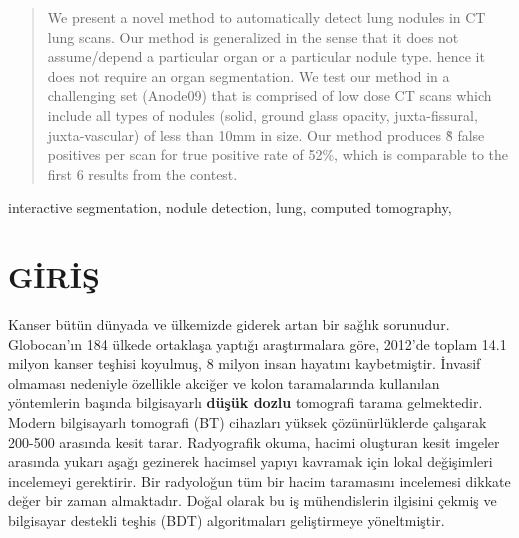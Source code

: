 \documentclass[conference]{IEEEtran}
\begin{document}
\begin{abstract}
We present a novel method to automatically detect lung nodules in CT lung scans. Our method is generalized in the sense that it does not assume/depend a particular organ or a particular nodule type. hence it does not require an organ segmentation. We test our method in a challenging set (Anode09) that is comprised of low dose CT scans which include all types of nodules (solid, ground glass opacity, juxta-fissural, juxta-vascular) of less than 10mm in size. Our method produces \~8 false positives per scan for true positive rate of 52\%, which is comparable to the first 6 results from the contest.
\end{abstract}
\begin{IEEEkeywords}
interactive segmentation, nodule detection, lung, computed tomography,
\end{IEEEkeywords}



%
\IEEEpeerreviewmaketitle

\IEEEpubidadjcol

\section{GİRİŞ}

Kanser bütün dünyada ve ülkemizde giderek artan bir sağlık sorunudur. Globocan’ın \cite{ferlay2012} 184 ülkede ortaklaşa yaptığı araştırmalara göre, 2012’de toplam 14.1 milyon kanser teşhisi koyulmuş, 8 milyon insan hayatını kaybetmiştir. İnvasif olmaması nedeniyle özellikle akciğer ve kolon taramalarında kullanılan yöntemlerin başında bilgisayarlı \textbf{düşük dozlu} tomografi tarama gelmektedir. Modern bilgisayarlı tomografi (BT) cihazları yüksek çözünürlüklerde çalışarak 200-500 arasında kesit tarar. Radyografik okuma, hacimi oluşturan kesit imgeler arasında yukarı aşağı gezinerek hacimsel yapıyı kavramak için lokal değişimleri incelemeyi gerektirir. Bir radyoloğun tüm bir hacim taramasını incelemesi dikkate değer bir zaman almaktadır. Doğal olarak bu iş mühendislerin ilgisini çekmiş ve  bilgisayar destekli teşhis (BDT) algoritmaları geliştirmeye yöneltmiştir.
\end{document}

